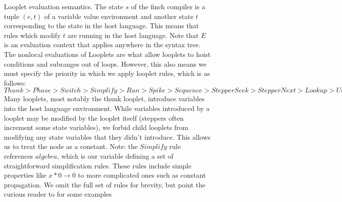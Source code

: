 \begin{figure}
    \caption{Looplet evaluation semantics. 
    The state $s$ of the finch compiler is a tuple $(e, t)$ of a variable value
    environment and another state $t$ corresponding to the state in the host
    language. This means that rules which modify $t$ are running in the host language. Note that $E$ is an evaluation context that applies anywhere in
    the syntax tree. The nonlocal evaluations of Looplets are what allow looplets to
    hoist conditions and subranges out of loops. However, this also means we must specify
    the priority in which we apply looplet rules, which is as follows:
    $Thunk > Phase > Switch > Simplify > Run > Spike > Sequence > StepperSeek > StepperNext > Lookup > Unfurl$
    Many looplets, most notably the thunk looplet, introduce variables into the
    host language environment.  While variables introduced by a looplet may be
    modified by the looplet itself (steppers often increment some state
    variables), we forbid child looplets from modifying any state variables that
    they didn't introduce. This allows us to treat the \finchvalue node as a
    constant.
    Note: the $Simplify$ rule references $algebra$, which is our variable
    defining a set of straightforward simplification rules. These rules include
    simple properties like $x * 0 \rightarrow 0$ to more complicated ones such
    as constant propagation. We omit the full set of rules for brevity, but
    point the curious reader to \cite[Figure 5]{ahrens_looplets_2023} for some examples}
    \label{fig:semantics_looplets}
\end{figure}


